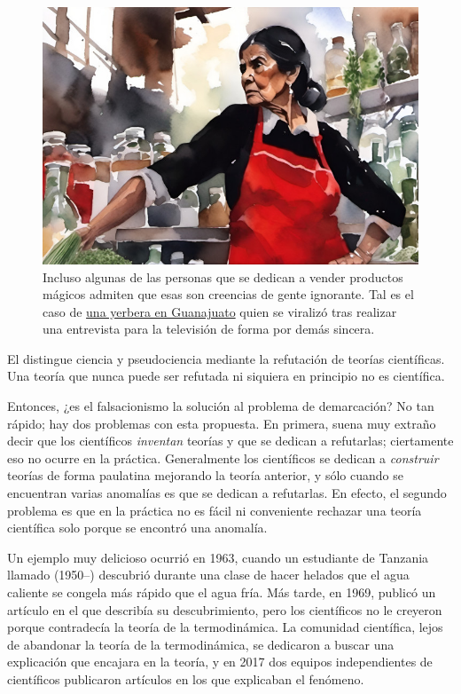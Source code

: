 \begin{figure}[ht]
    \centering
    \includegraphics[width=0.8\linewidth]{img/creenciasdegente}
    \caption{Incluso algunas de las personas que se dedican a vender productos
        mágicos admiten que esas son creencias de gente ignorante.
        Tal es el caso de %
        \href{https://eldeforma.com/2020/04/08/mujer-explota-quedate-en-casa-quien-me-mantiene-huevos-para-curar/}%
        {una yerbera en Guanajuato} quien se viralizó tras
        realizar una entrevista para la televisión de forma por demás
        sincera.}
\end{figure}

\begin{remember}
    \label{rem:falsacionismo}
    El  distingue ciencia y pseudociencia mediante
    la refutación de teorías científicas.
    Una teoría que nunca puede ser refutada ni siquiera en principio no es
    científica.
\end{remember}

Entonces, ¿es el falsacionismo la solución al problema de demarcación?
No tan rápido; hay dos problemas con esta propuesta.
En primera, suena muy extraño decir que los científicos \emph{inventan}
teorías y que se dedican a refutarlas; ciertamente eso no ocurre en la práctica.
Generalmente los científicos se dedican a \emph{construir} teorías de forma
paulatina mejorando la teoría anterior, y sólo cuando se encuentran varias
anomalías es que se dedican a refutarlas.
En efecto, el segundo problema es que en la práctica no es fácil ni conveniente
rechazar una teoría científica solo porque se encontró una anomalía.

Un ejemplo muy delicioso ocurrió en 1963, cuando un estudiante de Tanzania
llamado  (1950--) descubrió durante una
clase de hacer helados que el agua caliente se congela más rápido que el agua
fría.
Más tarde, en 1969, publicó un artículo en el que describía su
descubrimiento\cite{Mpemba1979}, pero los científicos no le creyeron porque
contradecía la teoría de la termodinámica.
La comunidad científica, lejos de abandonar la teoría de la termodinámica, se
dedicaron a buscar una explicación que encajara en la teoría, y en 2017 dos
equipos independientes de científicos publicaron artículos en los que explicaban
el fenómeno.

